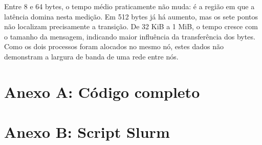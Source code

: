 \documentclass[11pt,letterpaper]{article}
\begin{document}
Entre 8 e 64 bytes, o tempo médio praticamente não muda: é a região em que a latência domina nesta medição. Em 512 bytes já há aumento, mas os sete pontos não localizam precisamente a transição. De 32 KiB a 1 MiB, o tempo cresce com o tamanho da mensagem, indicando maior influência da transferência dos bytes. Como os dois processos foram alocados no mesmo nó, estes dados não demonstram a largura de banda de uma rede entre nós.

\appendix
\clearpage
\section*{Anexo A: Código completo}


\section*{Anexo B: Script Slurm}

\end{document}
